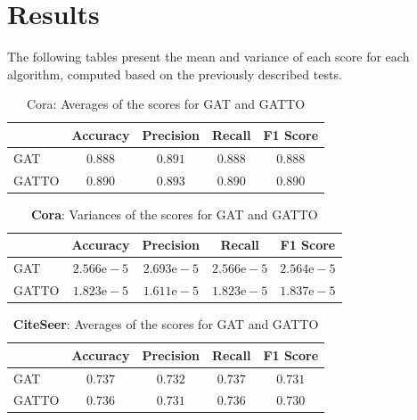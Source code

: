 \documentclass[12pt,conference]{ieeeconf} %
\begin{document}
\section{Results} 
The following tables present the mean and variance of each score for each algorithm, computed based on the previously described tests.
\begin{table}[h!]
    \centering
    \begin{tabular}{|l|c|c|c|c|} 
    \hline
     & Accuracy & Precision & Recall & F1 Score \\ \hline
    GAT &$0.888$ &$0.891$ &$0.888$ &$0.888$ \\ \hline
    GATTO &$0.890$ &$0.893$ &$0.890$ &$0.890$\\ \hline
    \end{tabular}
    \caption{{Cora}: Averages of the scores for GAT and GATTO}
\end{table}

\begin{table}[h!]
    \centering 
    \begin{tabular}{|l|c|c|c|c|} 
    \hline
     & Accuracy & Precision & Recall & F1 Score \\ \hline
    GAT &$2.566\text{e}-5$ &$2.693\text{e}-5$ &$2.566\text{e}-5$ &$2.564\text{e}-5$ \\ \hline
    GATTO &$1.823\text{e}-5$ &$1.611\text{e}-5$ &$1.823\text{e}-5$ &$1.837\text{e}-5$\\ \hline
    \end{tabular}
    \caption{\textbf{Cora}: Variances of the scores for GAT and GATTO}
\end{table}

\begin{table}[h!]
    \centering
    \begin{tabular}{|l|c|c|c|c|} 
    \hline
     & Accuracy & Precision & Recall & F1 Score \\ \hline
    GAT &$0.737$ &$0.732$ &$0.737$ &$0.731$ \\ \hline
    GATTO &$0.736$ &$0.731$ &$0.736$ &$ 0.730$\\ \hline
    \end{tabular}
    \caption{\textbf{CiteSeer}: Averages of the scores for GAT and GATTO}
\end{table}
\end{document}
